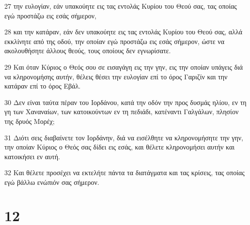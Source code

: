 \par 27 την ευλογίαν, εάν υπακούητε εις τας εντολάς Κυρίου του Θεού σας, τας οποίας εγώ προστάζω εις εσάς σήμερον,
\par 28 και την κατάραν, εάν δεν υπακούητε εις τας εντολάς Κυρίου του Θεού σας, αλλά εκκλίνητε από της οδού, την οποίαν εγώ προστάζω εις εσάς σήμερον, ώστε να ακολουθήσητε άλλους θεούς, τους οποίους δεν εγνωρίσατε.
\par 29 Και όταν Κύριος ο Θεός σου σε εισαγάγη εις την γην, εις την οποίαν υπάγεις διά να κληρονομήσης αυτήν, θέλεις θέσει την ευλογίαν επί το όρος Γαριζίν και την κατάραν επί το όρος Εβάλ.
\par 30 Δεν είναι ταύτα πέραν του Ιορδάνου, κατά την οδόν την προς δυσμάς ηλίου, εν τη γη των Χαναναίων, των κατοικούντων εν τη πεδιάδι, κατέναντι Γαλγάλων, πλησίον της δρυός Μορέχ;
\par 31 Διότι σεις διαβαίνετε τον Ιορδάνην, διά να εισέλθητε να κληρονομήσητε την γην, την οποίαν Κύριος ο Θεός σας δίδει εις εσάς, και θέλετε κληρονομήσει αυτήν και κατοικήσει εν αυτή.
\par 32 Και θέλετε προσέχει να εκτελήτε πάντα τα διατάγματα και τας κρίσεις, τας οποίας εγώ βάλλω ενώπιόν σας σήμερον.

\chapter{12}

